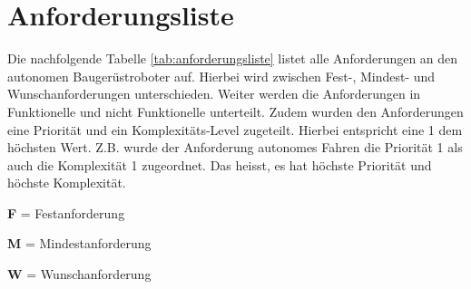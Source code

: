 \section*{Anforderungsliste}
\label{sec:anforderungsliste}
Die nachfolgende Tabelle \ref{tab:anforderungsliste} listet alle Anforderungen an den autonomen Baugerüstroboter auf. Hierbei wird zwischen Fest-, Mindest- und Wunschanforderungen unterschieden. Weiter werden die Anforderungen in Funktionelle und nicht Funktionelle unterteilt. Zudem wurden den Anforderungen eine Priorität und ein Komplexitäts-Level zugeteilt. Hierbei entspricht eine 1 dem höchsten Wert. Z.B. wurde der Anforderung autonomes Fahren die Priorität 1 als auch die Komplexität 1 zugeordnet. Das heisst, es hat höchste Priorität und höchste Komplexität.
\begin{items}
  \item {\bf F} = Festanforderung
  \item {\bf M} = Mindestanforderung
  \item {\bf W} = Wunschanforderung
\end{items}

